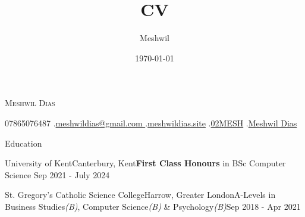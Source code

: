 \documentclass[11pt]{article}
\title{CV}
\author{Meshwil}
\date{\today}
\newlength{\secsep}
\newlength{\seperate}
\newcommand{\coloredhrulefill}[2][black]{%
    \leavevmode%
    \leaders\hbox{\textcolor{#1}{\rule{1ex}{0.5pt}}}\hfill\kern0pt%
}
\newcommand{\name}[1]{\begin{center}\textsc{\Huge#1}\end{center}}
\newcommand{\contactSpace}{\hspace{0.25cm}.\hspace{0.25cm}} %
\newcommand{\contact}[1]{\vspace*{2\secsep}\begin{center}\small#1 \end{center}\vspace*{2\secsep}} %
\newcommand{\lineunder}{\vspace*{-24pt} \hspace*{-6pt} \coloredhrulefill[contactgrey]{}  \\* \vspace*{-15pt}}
\newenvironment{resume_header}{}{\vspace{0pt}}
\newenvironment{tabbedList}[1]{
	\begin{list}{}{
      \setlength{\itemsep}{0pt}
      \setlength{\labelsep}{0pt}
      \setlength{\labelwidth}{0pt}
      \setlength{\leftmargin}{10pt}
      \setlength{\rightmargin}{0pt}
      \setlength{\listparindent}{0pt}
      \setlength{\parsep}{0pt}
      \setlength{\parskip}{0pt}
      \setlength{\partopsep}{0pt}
      \setlength{\topsep}{#1}
	}
	\item[]
}{\end{list}}
\newenvironment{resume_section}[1] {
	\textsc{\Large #1} \\*
	
	\lineunder
	\begin{tabbedList}{\secsep}
}{\end{tabbedList}\vspace{1.2\secsep}}
\newenvironment{resume_subsection}[4] {
	\textbf{#1} \hfill {\footnotesize #2}\vspace*{-1px}\\*  %
	{\small#3} \hfill {\footnotesize \textit{#4}} \hspace{-4px}\vspace*{-8px}
	
	\begin{tabbedList}{0pt}
}{\end{tabbedList}}
\begin{document}
	\begin{resume_header}
		\name{Meshwil Dias}
		\contact{\faPhoneSquare \hspace{\secsep} 07865076487 \contactSpace \href{mailto:meshwildias@gmail.com}{\faSend \hspace{\secsep}meshwildias@gmail.com } \contactSpace \href{https://www.meshwildias.site/}{\faCompass \hspace{\secsep}meshwildias.site} \contactSpace \href{https://github.com/02MESH}{\faGithub \hspace{\secsep}02MESH} \contactSpace \href{https://www.linkedin.com/in/mad-0000/}{\faLinkedinSquare \hspace{\secsep}Meshwil Dias}}
	\end{resume_header}
	
	\vspace*{1.5\seperate}	
	
	\begin{resume_section}{Education}
    \begin{resume_subsection}{University of Kent}{Canterbury, Kent}{\textbf{First Class Honours} in BSc Computer Science }{Sep 2021 - July 2024}
		\end{resume_subsection}
		
		
		\begin{resume_subsection}{St. Gregory's Catholic Science College}{Harrow, Greater London}{A-Levels in Business Studies\textit{(B)}, Computer Science\textit{(B)} \& Psychology\textit{(B)}}{Sep 2018 - Apr 2021}
		\end{resume_subsection}
	\end{resume_section}
	
\end{document}
